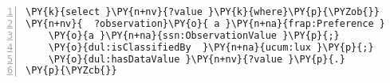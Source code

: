 \expandafter\def\csname PY@tok@err\endcsname{}
\begin{Verbatim}[commandchars=\\\{\},numbers=left,firstnumber=1,stepnumber=1]
\PY{k}{select }\PY{n+nv}{?value }\PY{k}{where}\PY{p}{\PYZob{}}
\PY{n+nv}{  ?observation}\PY{o}{ a }\PY{n+na}{frap:Preference }\PY{p}{;}
	\PY{o}{a }\PY{n+na}{ssn:ObservationValue }\PY{p}{;}
	\PY{o}{dul:isClassifiedBy  }\PY{n+na}{ucum:lux }\PY{p}{;}
	\PY{o}{dul:hasDataValue }\PY{n+nv}{?value }\PY{p}{.}
\PY{p}{\PYZcb{}}
\end{Verbatim}

